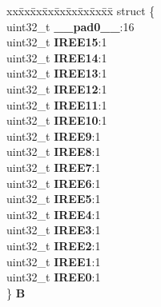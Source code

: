 \begin{DoxyCompactItemize}
\begin{tabbing}
\end{tabbing}\item 
\mbox{\label{unionSIU__tag_1_1SIU__IREER__tag_adf9067a9660d78a5b3cb4e98abe89af3}} 
\begin{tabbing}
xx\=xx\=xx\=xx\=xx\=xx\=xx\=xx\=xx\=\kill
struct \{\\
\>uint32\_t {\bfseries \_\_pad0\_\_}:16\\
\>uint32\_t {\bfseries IREE15}:1\\
\>uint32\_t {\bfseries IREE14}:1\\
\>uint32\_t {\bfseries IREE13}:1\\
\>uint32\_t {\bfseries IREE12}:1\\
\>uint32\_t {\bfseries IREE11}:1\\
\>uint32\_t {\bfseries IREE10}:1\\
\>uint32\_t {\bfseries IREE9}:1\\
\>uint32\_t {\bfseries IREE8}:1\\
\>uint32\_t {\bfseries IREE7}:1\\
\>uint32\_t {\bfseries IREE6}:1\\
\>uint32\_t {\bfseries IREE5}:1\\
\>uint32\_t {\bfseries IREE4}:1\\
\>uint32\_t {\bfseries IREE3}:1\\
\>uint32\_t {\bfseries IREE2}:1\\
\>uint32\_t {\bfseries IREE1}:1\\
\>uint32\_t {\bfseries IREE0}:1\\
\} {\bfseries B}\\


\end{tabbing}
\end{DoxyCompactItemize}

